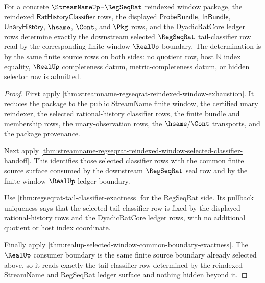 \begin{theorem}
\label{thm:regseqrat-tail-classifier-finite-window-handoff-exactness}
For a concrete $\StreamNameUp$--$\RegSeqRat$ reindexed window package, the
reindexed $\mathsf{RatHistoryClassifier}$ rows, the displayed
$\mathsf{ProbeBundle}$, $\mathsf{InBundle}$, $\mathsf{UnaryHistory}$, $\hsame$,
$\Cont$, and $\Pkg$ rows, and the DyadicRatCore ledger rows determine exactly
the downstream selected $\RegSeqRat$ tail-classifier row read by the
corresponding finite-window $\RealUp$ boundary. The determination is by the
same finite source rows on both sides: no quotient row, host $\mathbb{N}$ index
equality, $\RealUp$ completeness datum, metric-completeness datum, or hidden
selector row is admitted.
\end{theorem}
\begin{proof}
First apply
\autoref{thm:streamname-regseqrat-reindexed-window-exhaustion}. It reduces the
package to the public StreamName finite window, the certified unary reindexer,
the selected rational-history classifier rows, the finite bundle and membership
rows, the unary-observation rows, the $\hsame/\Cont$ transports, and the
package provenance.

Next apply
\autoref{thm:streamname-regseqrat-reindexed-window-selected-classifier-handoff}.
This identifies those selected classifier rows with the common finite source
surface consumed by the downstream $\RegSeqRat$ seal row and by the
finite-window $\RealUp$ ledger boundary.

Use \autoref{thm:regseqrat-tail-classifier-exactness} for the RegSeqRat side.
Its pullback uniqueness says that the selected tail-classifier row is fixed by
the displayed rational-history rows and the DyadicRatCore ledger rows, with no
additional quotient or host index coordinate.

Finally apply
\autoref{thm:realup-selected-window-common-boundary-exactness}. The
$\RealUp$ consumer boundary is the same finite source boundary already selected
above, so it reads exactly the tail-classifier row determined by the reindexed
StreamName and RegSeqRat ledger surface and nothing hidden beyond it.
\end{proof}


